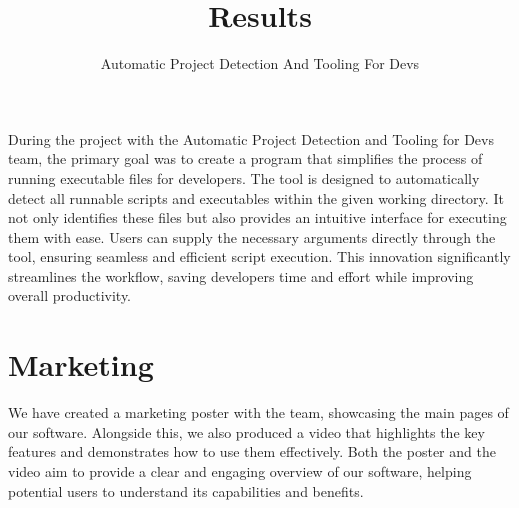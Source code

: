 \documentclass{article}
\title{Results}
\author{Automatic Project Detection And Tooling For Devs}
\date{}
\begin{document}
\maketitle

\clearpage

During the project with the Automatic Project Detection and Tooling for Devs team, the primary goal was to create a program that simplifies the process of running executable files for developers. The tool is designed to automatically detect all runnable scripts and executables within the given working directory. It not only identifies these files but also provides an intuitive interface for executing them with ease. Users can supply the necessary arguments directly through the tool, ensuring seamless and efficient script execution. This innovation significantly streamlines the workflow, saving developers time and effort while improving overall productivity.

\section{Marketing}

We have created a marketing poster with the team, showcasing the main pages of our software. Alongside this, we also produced a video that highlights the key features and demonstrates how to use them effectively. Both the poster and the video aim to provide a clear and engaging overview of our software, helping potential users to understand its capabilities and benefits.
\end{document}
